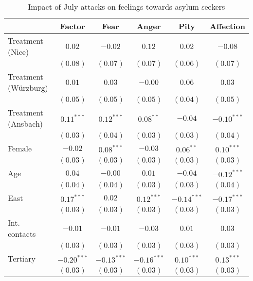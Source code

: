 
\begin{table}
\caption{Impact of July attacks on feelings towards asylum seekers}
\begin{center}
\begin{tabular}{l c c c c c}
\toprule
 & Factor & Fear & Anger & Pity & Affection \\
\midrule
Treatment (Nice)     & $0.02$        & $-0.02$       & $0.12$        & $0.02$        & $-0.08$       \\
                     & $(0.08)$      & $(0.07)$      & $(0.07)$      & $(0.06)$      & $(0.07)$      \\
Treatment (Würzburg) & $0.01$        & $0.03$        & $-0.00$       & $0.06$        & $0.03$        \\
                     & $(0.05)$      & $(0.05)$      & $(0.05)$      & $(0.04)$      & $(0.05)$      \\
Treatment (Ansbach)  & $0.11^{***}$  & $0.12^{***}$  & $0.08^{**}$   & $-0.04$       & $-0.10^{***}$ \\
                     & $(0.03)$      & $(0.04)$      & $(0.03)$      & $(0.03)$      & $(0.04)$      \\
Female               & $-0.02$       & $0.08^{***}$  & $-0.03$       & $0.06^{**}$   & $0.10^{***}$  \\
                     & $(0.03)$      & $(0.03)$      & $(0.03)$      & $(0.03)$      & $(0.03)$      \\
Age                  & $0.04$        & $-0.00$       & $0.01$        & $-0.04$       & $-0.12^{***}$ \\
                     & $(0.04)$      & $(0.04)$      & $(0.03)$      & $(0.03)$      & $(0.04)$      \\
East                 & $0.17^{***}$  & $0.02$        & $0.12^{***}$  & $-0.14^{***}$ & $-0.17^{***}$ \\
                     & $(0.03)$      & $(0.03)$      & $(0.03)$      & $(0.03)$      & $(0.03)$      \\
Int. contacts        & $-0.01$       & $-0.01$       & $-0.03$       & $0.01$        & $0.03$        \\
                     & $(0.03)$      & $(0.03)$      & $(0.03)$      & $(0.03)$      & $(0.03)$      \\
Tertiary             & $-0.20^{***}$ & $-0.13^{***}$ & $-0.16^{***}$ & $0.10^{***}$  & $0.13^{***}$  \\
                     & $(0.03)$      & $(0.03)$      & $(0.03)$      & $(0.03)$      & $(0.03)$      \\

\end{tabular}
\end{center}
\end{table}
